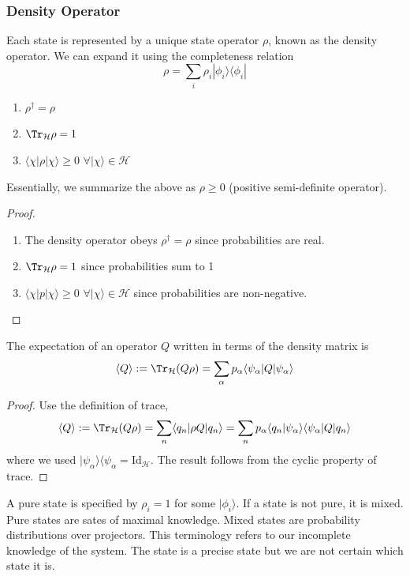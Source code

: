 \documentclass[a4paper]{article}
\begin{document}
\subsubsection*{Density Operator}
\begin{defi}
Each state is represented by a unique state operator $\rho$, known as the density operator. We can expand it using the completeness relation
$$\rho=\sum_i\rho_i|\phi_i\rangle\langle\phi_i|$$
\end{defi}
\begin{prop}\leavevmode
\begin{enumerate}
    \item $\rho^\dag=\rho$
    \item $\Tr_{\mathcal{H}}\rho=1$
    \item $\langle\chi|\rho|\chi\rangle\geq0$ $\forall|\chi\rangle\in\mathcal{H}$
\end{enumerate}
Essentially, we summarize the above as $\rho\geq0$ (positive semi-definite operator).
\end{prop}
\begin{proof}\leavevmode
\begin{enumerate}
    \item The density operator obeys $\rho^\dag=\rho$ since probabilities are real.
    \item $\Tr_{\mathcal{H}}\rho=1$ since probabilities sum to 1
    \item $\langle\chi|p|\chi\rangle\geq0$ $\forall|\chi\rangle\in\mathcal{H}$ since probabilities are non-negative. 
\end{enumerate}
\end{proof}
\begin{prop}
The expectation of an operator $Q$ written in terms of the density matrix is
$$\langle Q\rangle:=\Tr_{\mathcal{H}}(Q\rho)=\sum_\alpha p_\alpha\langle\psi_\alpha|Q|\psi_\alpha\rangle$$
\end{prop}
\begin{proof}
Use the definition of trace,
$$\langle Q\rangle:=\Tr_{\mathcal{H}}(Q\rho)=\sum_n\langle q_n|\rho Q|q_n\rangle=\sum_np_\alpha\langle q_n|\psi_\alpha\rangle\langle\psi_\alpha|Q|q_n\rangle$$
where we used $|\psi_\alpha\rangle\langle\psi_\alpha=\text{Id}_{\mathcal{H}}$. The result follows from the cyclic property of trace.
\end{proof}
\begin{defi}
A pure state is specified by $\rho_i=1$ for some $|\phi_i\rangle$. If a state is not pure, it is mixed. Pure states are sates of maximal knowledge. Mixed states are probability distributions over projectors. This terminology refers to our incomplete knowledge of the system. The state is a precise state but we are not certain which state it is.
\end{defi}
\end{document}
